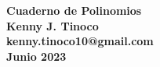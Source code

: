 \begin{center}
    \textbf
    {
        {\LARGE Cuaderno de Polinomios}\\\vspace{4mm}
        Kenny J. Tinoco\\\vspace{1mm}
        kenny.tinoco10@gmail.com\\\vspace{1mm}
        Junio 2023
    }
\end{center}

\thispagestyle{first-page-style}

\tableofcontents